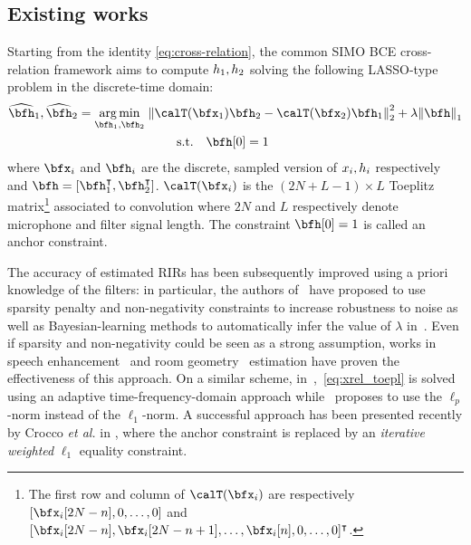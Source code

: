\subsection{Existing works}
Starting from the identity \eqref{eq:cross-relation}, the common SIMO BCE cross-relation framework aims to compute $h_1, h_2$ solving the following LASSO-type problem in the discrete-time domain:
\begin{multline}
    \label{eq:xrel_toepl}
    \disFilterHat_1, \disFilterHat_2
    =
    \kargmin_{\disFilter_1, \disFilter_2}
    \;
    \kvvbar{
        \calT(\disRecordedSignal_1) \disFilter_2
        -
        \calT(\disRecordedSignal_2) \disFilter_1
    }_2^2
    +
    \lambda
    \kvvbar{
        \disFilter
    }_1
    \\
    \text{s.t.} \quad \disFilter[0] = 1
    \qquad
\end{multline}
where $\disRecordedSignal_i$ and $\disFilter_i$ are the discrete, sampled version of $x_i, h_i$ respectively and $\disFilter = [\disFilter_1^\intercal, \disFilter_2^\intercal]$.
$\calT(\disRecordedSignal_i)$ is the $(2N+L-1) \times L$ Toeplitz matrix\footnote{The first row and column of $\calT(\disRecordedSignal_i)$ are respectively $[\disRecordedSignal_i[2N-n], 0,\dotsc,0]$ and $[\disRecordedSignal_i[2N-n], \disRecordedSignal_i[2N-n+1],\dotsc,\disRecordedSignal_i[n], 0,\dotsc, 0]^\intercal$.} associated to convolution where $2N$ and $L$ respectively denote  microphone and filter signal length.
The constraint $\disFilter[0]=1$ is called an anchor constraint.

The accuracy of estimated RIRs has been subsequently improved using a priori knowledge of the filters: in particular, the authors of~\cite{Lin2007} have proposed to use sparsity penalty and non-negativity constraints to increase robustness to noise as well as Bayesian-learning methods to automatically infer the value of $\lambda$ in~\cite{Lin2008}.
Even if sparsity and non-negativity could be seen as a strong assumption, works in speech enhancement~\cite{Ribeiro2010,Dokmanic2015a} and room geometry~\cite{Antonacci2012,Crocco2017} estimation have proven the effectiveness of this approach.
On a similar scheme, in~\cite{Kowalczyk2013},~\eqref{eq:xrel_toepl} is solved using an adaptive time-frequency-domain approach while~\cite{Aissa-El-Bey2008} proposes to use the $\ell_p$-norm instead of the $\ell_1$-norm.
A successful approach has been presented recently by Crocco \textit{et al.} in \cite{Crocco2016}, where the anchor constraint is replaced by an \textit{iterative weighted} $\ell_1$ equality constraint.

